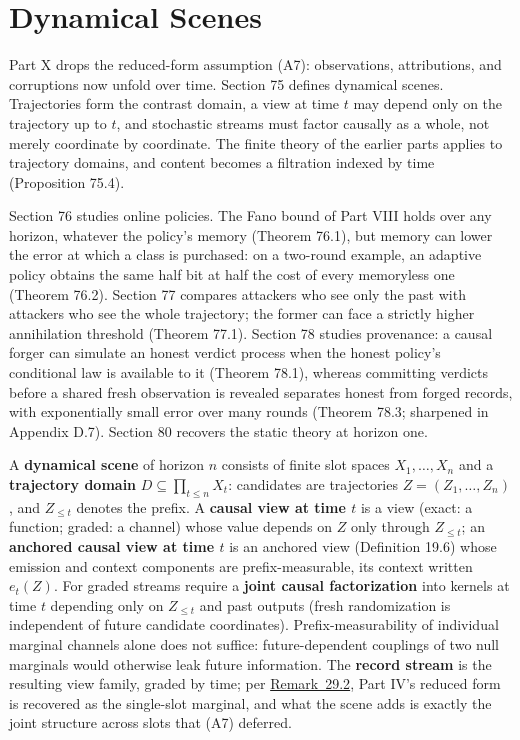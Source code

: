 \part{Dynamical Scenes}


Part X drops the reduced-form assumption (A7): observations, attributions, and corruptions now unfold over time. Section 75 defines dynamical scenes. Trajectories form the contrast domain, a view at time \(t\) may depend only on the trajectory up to \(t\), and stochastic streams must factor causally as a whole, not merely coordinate by coordinate. The finite theory of the earlier parts applies to trajectory domains, and content becomes a filtration indexed by time (Proposition 75.4).

Section 76 studies online policies. The Fano bound of Part VIII holds over any horizon, whatever the policy's memory (Theorem 76.1), but memory can lower the error at which a class is purchased: on a two-round example, an adaptive policy obtains the same half bit at half the cost of every memoryless one (Theorem 76.2). Section 77 compares attackers who see only the past with attackers who see the whole trajectory; the former can face a strictly higher annihilation threshold (Theorem 77.1). Section 78 studies provenance: a causal forger can simulate an honest verdict process when the honest policy's conditional law is available to it (Theorem 78.1), whereas committing verdicts before a shared fresh observation is revealed separates honest from forged records, with exponentially small error over many rounds (Theorem 78.3; sharpened in Appendix D.7). Section 80 recovers the static theory at horizon one.


\begin{thmdef}

A \textbf{dynamical scene} of horizon \(n\) consists of finite slot spaces \(X_1, \dots, X_n\) and a \textbf{trajectory domain} \(D \subseteq \prod_{t \le n} X_t\): candidates are trajectories \(Z = (Z_1, \dots, Z_n)\), and \(Z_{\le t}\) denotes the prefix. A \textbf{causal view at time \(t\)} is a view (exact: a function; graded: a channel) whose value depends on \(Z\) only through \(Z_{\le t}\); an \textbf{anchored causal view at time \(t\)} is an anchored view (Definition 19.6) whose emission and context components are prefix-measurable, its context written \(e_t(Z)\). For graded streams require a \textbf{joint causal factorization} into kernels at time \(t\) depending only on \(Z_{\le t}\) and past outputs (fresh randomization is independent of future candidate coordinates). Prefix-measurability of individual marginal channels alone does not suffice: future-dependent couplings of two null marginals would otherwise leak future information. The \textbf{record stream} is the resulting view family, graded by time; per \hyperlink{stmt:29.2}{Remark~29.2}, Part IV's reduced form is recovered as the single-slot marginal, and what the scene adds is exactly the joint structure across slots that (A7) deferred.
\end{thmdef}


